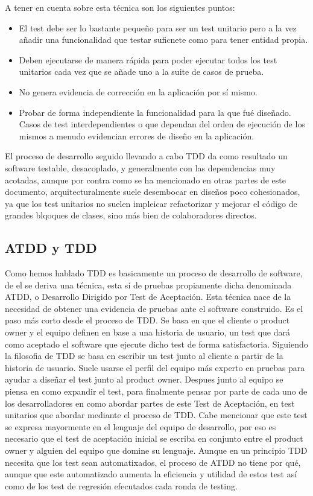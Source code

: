 \documentclass[../pfc.tex]{subfiles}
\begin{document}
	A tener en cuenta sobre esta técnica son los siguientes puntos:
		\begin{itemize}
			\item El test debe ser lo bastante pequeño para ser un test unitario pero a la vez añadir una funcionalidad que testar suficnete como para tener entidad propia. 
			\item Deben ejecutarse de manera rápida para poder ejecutar todos los test unitarios cada vez que se añade uno a la suite de casos de prueba.
			\item No genera evidencia de corrección en la aplicación por sí mismo.
			\item Probar de forma independiente la funcionalidad para la que fué diseñado. Casos de test interdependientes o que dependan del orden de ejecución de los mismos a menudo evidencian errores de diseño en la aplicación.
		\end{itemize}
	
	El proceso de desarrollo seguido llevando a cabo TDD da como resultado un software testable, desacoplado, y generalmente con las dependencias muy acotadas, aunque por contra como se ha mencionado en otras partes de este documento, arquitecturalmente suele desembocar en diseños poco cohesionados, ya que los test unitarios no suelen impleicar refactorizar y mejorar el código de grandes blqoques de clases, sino más bien de colaboradores directos. 
		 
	
	\subsection{ATDD y TDD}
	
	Como hemos hablado TDD es basicamente un proceso de desarrollo de software, de el se deriva una técnica, esta sí de pruebas propiamente dicha denominada ATDD, o Desarrollo Dirigido por Test de Aceptación. Esta técnica nace de la necesidad de obtener una evidencia de pruebas ante el software construido. Es el paso más corto desde el proceso de TDD. Se basa en que el cliente o product owner y el equipo definen en base a una historia de usuario, un test que dará como aceptado el software que ejecute dicho test de forma satisfactoria. Siguiendo la filosofia de TDD se basa en escribir un test junto al cliente a partir de la historia de usuario. Suele usarse el perfil del equipo más experto en pruebas para ayudar a diseñar el test junto al product owner. Despues junto al equipo se piensa en como expandir el test, para finalmente pensar por parte de cada uno de los desarrolladores en como abordar partes de este Test de Aceptación, en test unitarios que abordar mediante el proceso de TDD. Cabe mencionar que este test se expresa mayormente en el lenguaje del equipo de desarrollo, por eso es necesario que el test de aceptación inicial se escriba en conjunto entre el product owner y alguien del equipo que domine su lenguaje. Aunque en un principio TDD necesita que los test sean automatixados, el proceso de ATDD no tiene por qué, aunque que este automatizado aumenta la eficiencia y utilidad de estos test así como de los test de regresión efecutados cada ronda de testing. 
		
\end{document}
